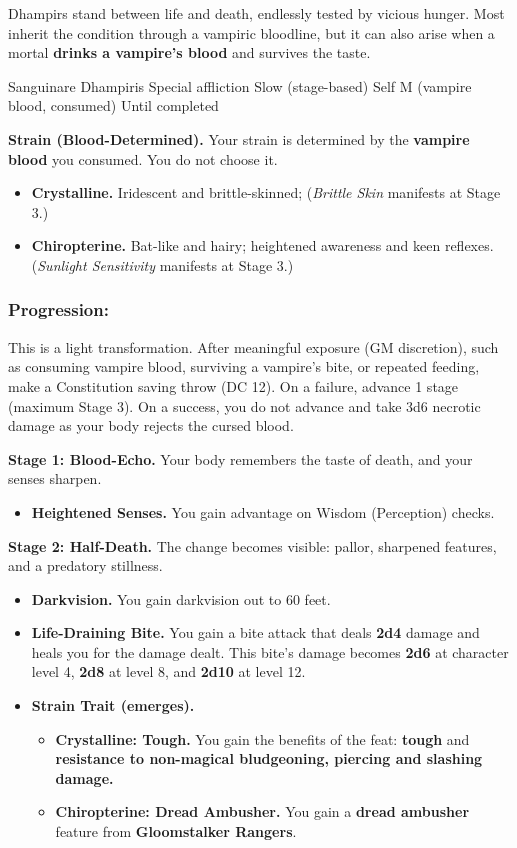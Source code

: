 Dhampirs stand between life and death, endlessly tested by vicious hunger. Most inherit the condition through a vampiric bloodline, but it can also arise when a mortal \textbf{drinks a vampire's blood} and survives the taste.

\DndSpellHeader%
  {Sanguinare Dhampiris}
  {Special affliction}
  {Slow (stage-based)}
  {Self}
  {M (vampire blood, consumed)}
  {Until completed}

\textbf{Strain (Blood-Determined).} Your strain is determined by the \textbf{vampire blood} you consumed. You do not choose it.
\begin{itemize}
\item \textbf{Crystalline.} Iridescent and brittle-skinned; (\emph{Brittle Skin} manifests at Stage 3.)
\item \textbf{Chiropterine.} Bat-like and hairy; heightened awareness and keen reflexes. (\emph{Sunlight Sensitivity} manifests at Stage 3.)
\end{itemize}

\subsubsection{Progression:}
This is a light transformation. After meaningful exposure (GM discretion), such as consuming vampire blood, surviving a vampire's bite, or repeated feeding, make a Constitution saving throw (DC 12). On a failure, advance 1 stage (maximum Stage 3). On a success, you do not advance and take 3d6 necrotic damage as your body rejects the cursed blood.

\medskip

\textbf{Stage 1: Blood-Echo.}
Your body remembers the taste of death, and your senses sharpen.
\begin{itemize}
\item \textbf{Heightened Senses.} You gain advantage on Wisdom (Perception) checks.
\end{itemize}

\textbf{Stage 2: Half-Death.}
The change becomes visible: pallor, sharpened features, and a predatory stillness.
\begin{itemize}
\item \textbf{Darkvision.} You gain darkvision out to 60 feet.
\item \textbf{Life-Draining Bite.} You gain a bite attack that deals \textbf{2d4} damage and heals you for the damage dealt. This bite's damage becomes \textbf{2d6} at character level 4, \textbf{2d8} at level 8, and \textbf{2d10} at level 12.
\item \textbf{Strain Trait (emerges).}
\begin{itemize}
\item \textbf{Crystalline: Tough.} You gain the benefits of the feat: \textbf{tough} and \textbf{resistance to non-magical bludgeoning, piercing and slashing damage.}
\item \textbf{Chiropterine: Dread Ambusher.} You gain a \textbf{dread ambusher} feature from \textbf{Gloomstalker Rangers}.
\end{itemize}
\end{itemize}

